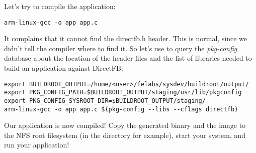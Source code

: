 Let's try to compile the application:

\begin{verbatim}
arm-linux-gcc -o app app.c
\end{verbatim}

It complains that it cannot find the directfb.h header. This is
normal, since we didn't tell the compiler where to find it. So let's
use  to query the {\em pkg-config} database about the
location of the header files and the list of libraries needed to build
an application against DirectFB:

\small
\begin{verbatim}
export BUILDROOT_OUTPUT=/home/<user>/felabs/sysdev/buildroot/output/
export PKG_CONFIG_PATH=$BUILDROOT_OUTPUT/staging/usr/lib/pkgconfig
export PKG_CONFIG_SYSROOT_DIR=$BUILDROOT_OUTPUT/staging/
arm-linux-gcc -o app app.c $(pkg-config --libs --cflags directfb)
\end{verbatim}
\normalsize

Our application is now compiled! Copy the generated binary and the
 image to the NFS root filesystem (in the
 directory for example), start your system, and run your
application!
